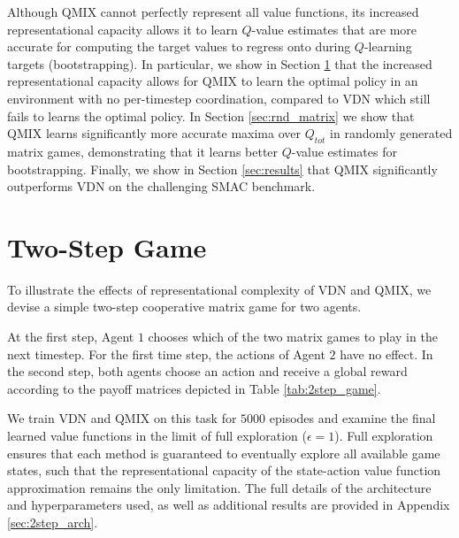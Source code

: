 \documentclass[twoside,11pt]{article}
\begin{document}
Although QMIX cannot perfectly represent all value functions, its increased representational capacity allows it to learn $Q$-value estimates that are more accurate for computing the target values to regress onto during $Q$-learning targets (bootstrapping). 
In particular, we show in Section \ref{sec:two_step_game} that the increased representational capacity allows for QMIX to learn the optimal policy in an environment with no per-timestep coordination, compared to VDN which still fails to learns the optimal policy.
In Section \ref{sec:rnd_matrix} we show that QMIX learns significantly more accurate maxima over $Q_{tot}$ in randomly generated matrix games, demonstrating that it learns better $Q$-value estimates for bootstrapping.   
Finally, we show in Section \ref{sec:results} that QMIX significantly outperforms VDN on the challenging SMAC benchmark.

 \section{Two-Step Game}
\label{sec:two_step_game}


To illustrate the effects of representational complexity of VDN and QMIX, we devise a simple two-step cooperative matrix game for two agents. 

At the first step, Agent $1$ chooses which of the two matrix games to play in the next timestep. For the first time step, the actions of Agent $2$ have no effect. In the second step, both agents choose an action and receive a global reward according to the payoff matrices depicted in Table \ref{tab:2step_game}.

We train VDN and QMIX on this task for $5000$ episodes and examine the final learned value functions in the limit of full exploration ($\epsilon=1$). Full exploration ensures that each method is guaranteed to eventually explore all available game states, such that the representational capacity of the state-action value function approximation remains the only limitation.
The full details of the architecture and hyperparameters used, as well as additional results are provided in Appendix \ref{sec:2step_arch}.
\end{document}
